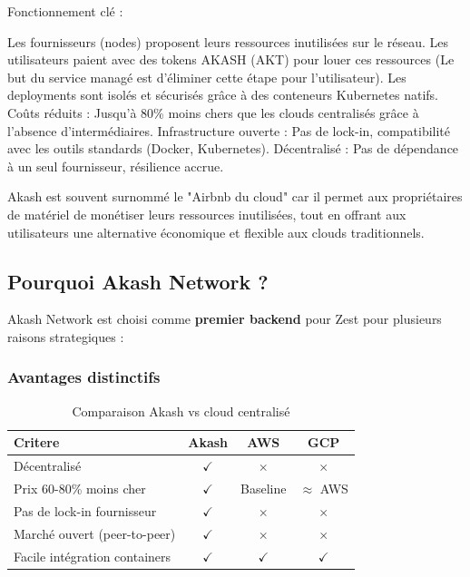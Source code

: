\documentclass[11pt,a4paper]{article}
\begin{document}
	Fonctionnement clé :
	
	Les fournisseurs (nodes) proposent leurs ressources inutilisées sur le réseau.
	Les utilisateurs paient avec des tokens AKASH (AKT) pour louer ces ressources (Le but du service managé est d'éliminer cette étape pour l'utilisateur).
	Les deployments sont isolés et sécurisés grâce à des conteneurs Kubernetes natifs.
	Coûts réduits : Jusqu'à 80\% moins chers que les clouds centralisés grâce à l'absence d'intermédiaires.
	Infrastructure ouverte : Pas de lock-in, compatibilité avec les outils standards (Docker, Kubernetes).
	Décentralisé : Pas de dépendance à un seul fournisseur, résilience accrue.
	
	Akash est souvent surnommé le "Airbnb du cloud" car il permet aux propriétaires de matériel de monétiser leurs ressources inutilisées, tout en offrant aux utilisateurs une alternative économique et flexible aux clouds traditionnels.
	
	\subsection{Pourquoi Akash Network ?}
	
	Akash Network est choisi comme \textbf{premier backend} pour Zest pour plusieurs raisons strategiques :
	
	\subsubsection{Avantages distinctifs}
	
	\begin{table}[H]
		\centering
		\small
		\begin{tabularx}{\linewidth}{l | c | c | c}
			\toprule
			\textbf{Critere} & \textbf{Akash} & \textbf{AWS} & \textbf{GCP} \\
			\midrule
			Décentralisé & $\checkmark$ & $\times$ & $\times$ \\
			Prix 60-80\% moins cher & $\checkmark$ & Baseline & $\approx$ AWS \\
			Pas de lock-in fournisseur & $\checkmark$ & $\times$ & $\times$ \\
			Marché ouvert (peer-to-peer) & $\checkmark$ & $\times$ & $\times$ \\
			Facile intégration containers & $\checkmark$ & $\checkmark$ & $\checkmark$ \\
			\bottomrule
		\end{tabularx}
		\caption{Comparaison Akash vs cloud centralisé}
	\end{table}
	
\end{document}
